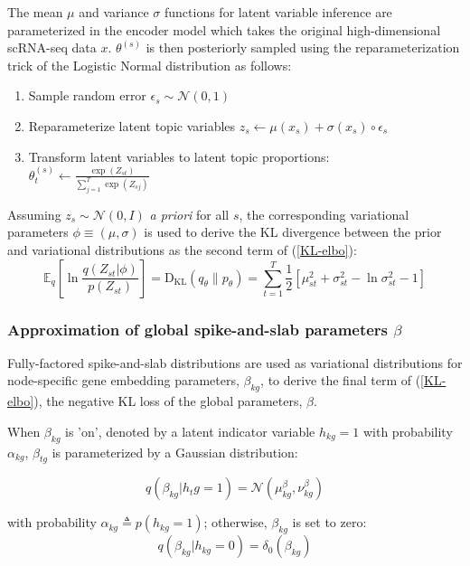 The mean $\mu$ and variance $\sigma$ functions for latent variable inference are parameterized in the encoder model which takes the original high-dimensional scRNA-seq data $x$. $\theta^{(s)}$ is then posteriorly sampled using the reparameterization trick of the Logistic Normal distribution as follows: 
\begin{enumerate}
    \item Sample random error $\epsilon_s \sim \mathcal{N}(0,1)$
    \item Reparameterize latent topic variables $z_s \leftarrow \mu(x_s) + \sigma(x_s) \circ \epsilon_s$
    \item Transform latent variables to latent topic proportions: \\$\theta_t^{(s)} \leftarrow \frac{\exp(Z_{st})}{\sum_{j = 1}^T \exp(Z_{sj})}$
\end{enumerate}

Assuming $z_s \sim \mathcal{N}(0, I)$ \textit{a priori} for all $s$, the corresponding variational parameters $\phi \equiv (\mu, \sigma)$ is used to derive the KL divergence between the prior and variational distributions as the second term of (\ref{KL-elbo}): 
\begin{equation}
    \mathbb{E}_q \left[\ln \frac{q(Z_{st} | \phi)}{p(Z_{st})}\right] = \text{D}_{\text{KL}}(q_\theta \parallel p_\theta) = \sum_{t = 1}^T \frac{1}{2}[\mu_{st}^2 + \sigma_{st}^2 - \ln \sigma_{st}^2 - 1]
\end{equation}

\subsubsection{Approximation of global spike-and-slab parameters $\beta$}

Fully-factored spike-and-slab distributions are used as variational distributions for node-specific gene embedding parameters, $\beta_{kg}$, to derive the final term of (\ref{KL-elbo}), the negative KL loss of the global parameters, $\beta$.

When $\beta_{kg}$ is 'on', denoted by a latent indicator variable $h_{kg} = 1$ with probability $\alpha_{kg}$, $\beta_{tg}$ is parameterized by a Gaussian distribution:

\begin{equation*}
    q(\beta_{kg}| h_tg =1) = \mathcal{N}\left(\mu_{kg}^\beta, \nu_{kg}^\beta\right)
\end{equation*}

with probability $\alpha_{kg} \triangleq p(h_{kg} = 1)$; otherwise, $\beta_{kg}$ is set to zero:
\begin{equation*}
    q(\beta_{kg}|h_{kg} = 0) = \delta_0(\beta_{kg})
\end{equation*}

